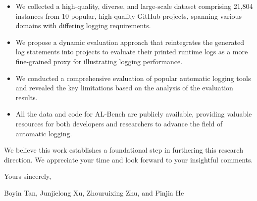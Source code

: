 \begin{itemize}
  \item We collected a high-quality, diverse, and large-scale dataset comprising 21,804 instances from 10 popular, high-quality GitHub projects, spanning various domains with differing logging requirements.

  \item We propose a dynamic evaluation approach that reintegrates the generated log statements into projects to evaluate their printed runtime logs as a more fine-grained proxy for illustrating logging performance.

  \item We conducted a comprehensive evaluation of popular automatic logging tools and revealed the key limitations based on the analysis of the evaluation results.

  \item All the data and code for AL-Bench are publicly available, providing valuable resources for both developers and researchers to advance the field of automatic logging.
\end{itemize}

We believe this work establishes a foundational step in furthering this research direction. We appreciate your time and look forward to your insightful comments.

\noindent Yours sincerely,

\noindent Boyin Tan, Junjielong Xu, Zhouruixing Zhu, and Pinjia He
